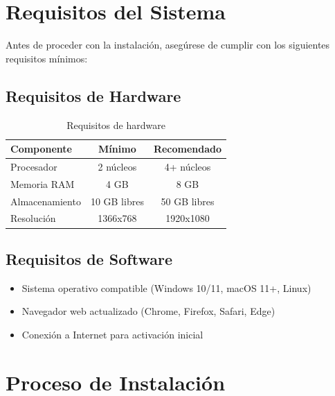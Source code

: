 

\section{Requisitos del Sistema}

Antes de proceder con la instalación, asegúrese de cumplir con los siguientes requisitos mínimos:

\subsection{Requisitos de Hardware}

\begin{table}[h]
\centering
\begin{tabular}{lcc}
\toprule
\textbf{Componente} & \textbf{Mínimo} & \textbf{Recomendado} \\
\midrule
Procesador & 2 núcleos & 4+ núcleos \\
Memoria RAM & 4 GB & 8 GB \\
Almacenamiento & 10 GB libres & 50 GB libres \\
Resolución & 1366x768 & 1920x1080 \\
\bottomrule
\end{tabular}
\caption{Requisitos de hardware}
\end{table}

\subsection{Requisitos de Software}

\begin{itemize}
    \item Sistema operativo compatible (Windows 10/11, macOS 11+, Linux)
    \item Navegador web actualizado (Chrome, Firefox, Safari, Edge)
    \item Conexión a Internet para activación inicial
\end{itemize}

\section{Proceso de Instalación}

